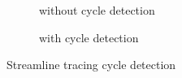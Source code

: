 \documentclass[twocolumn]{article}
\begin{document}
\begin{figure}[t!]
    \centering
    \begin{subfigure}[b]{2.4in}
        \caption{without cycle detection}
    \end{subfigure}
    \hspace{20pt}
    \begin{subfigure}[b]{2.4in}
        \caption{with cycle detection}
    \end{subfigure}
\caption{Streamline tracing cycle detection}
\label{fig:cycles}
\end{figure}
\end{document}

